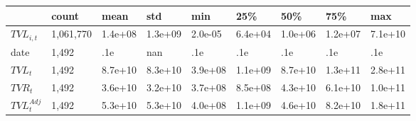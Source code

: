 \begin{tabular}{lllllllll}
\toprule
 & count & mean & std & min & 25\% & 50\% & 75\% & max \\
\midrule
$TVL_{i,t}$ & 1,061,770 & 1.4e+08 & 1.3e+09 & 2.0e-05 & 6.4e+04 & 1.0e+06 & 1.2e+07 & 7.1e+10 \\
date & 1,492 & .1e & nan & .1e & .1e & .1e & .1e & .1e \\
$TVL_t$ & 1,492 & 8.7e+10 & 8.3e+10 & 3.9e+08 & 1.1e+09 & 8.7e+10 & 1.3e+11 & 2.8e+11 \\
$TVR_t$ & 1,492 & 3.6e+10 & 3.2e+10 & 3.7e+08 & 8.5e+08 & 4.3e+10 & 6.1e+10 & 1.0e+11 \\
$TVL^{Adj}_t$ & 1,492 & 5.3e+10 & 5.3e+10 & 4.0e+08 & 1.1e+09 & 4.6e+10 & 8.2e+10 & 1.8e+11 \\
\bottomrule
\end{tabular}

